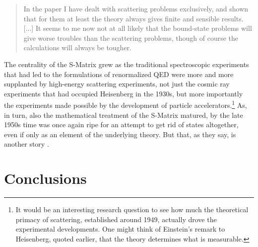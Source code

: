 \documentclass[12pt,a4paper]{article}
\begin{document}
\begin{quote}
In the paper I have dealt with scattering problems exclusively, and shown that for them at least the theory always gives finite and sensible results. [...] It seems to me now not at all likely that the bound-state problems will give worse troubles than the scattering problems, though of course the calculations will always be tougher.
\end{quote}

The centrality of the S-Matrix grew as the traditional spectroscopic experiments that had led to the formulations of renormalized QED were more and more supplanted by high-energy scattering experiments, not just the cosmic ray experiments that had occupied Heisenberg in the 1930s, but more importantly the experiments made possible by the development of particle accelerators.\footnote{It would be an interesting research question to see how much the theoretical primacy of scattering, established around 1949, actually drove the experimental developments. One might think of Einstein's remark to Heisenberg, quoted earlier, that the theory determines what is measurable.} As, in turn, also the mathematical treatment of the S-Matrix matured, by the late 1950s time was once again ripe for an attempt to get rid of states altogether, even if only as an element of the underlying theory. But that, as they say, is another story \citep{cushing_1990_theory}.

\section{Conclusions}
\end{document}
